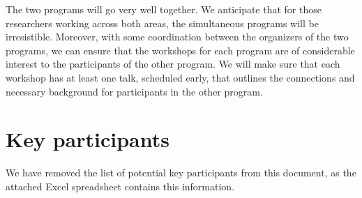 \documentclass[12pt]{article}
\begin{document}
The two programs will go very well together. We anticipate that for those researchers working across both areas, the simultaneous programs will be irresistible. Moreover, with some coordination between the organizers of the two programs, we can ensure that the workshops for each program are of considerable interest to the participants of the other program. We will make sure that each workshop has at least one talk, scheduled early, that outlines the connections and necessary background for participants in the other program.


\section{Key participants}
We have removed the list of potential key participants from this document, as the attached Excel spreadsheet contains this information.
\end{document}
